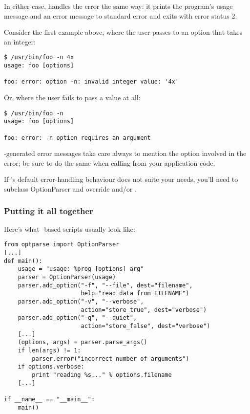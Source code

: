 In either case,  handles the error the same way: it prints the
program's usage message and an error message to standard error and
exits with error status 2.

Consider the first example above, where the user passes  to an
option that takes an integer:
\begin{verbatim}
$ /usr/bin/foo -n 4x
usage: foo [options]

foo: error: option -n: invalid integer value: '4x'
\end{verbatim}

Or, where the user fails to pass a value at all:
\begin{verbatim}
$ /usr/bin/foo -n
usage: foo [options]

foo: error: -n option requires an argument
\end{verbatim}

-generated error messages take care always to mention the option
involved in the error; be sure to do the same when calling
 from your application code.

If 's default error-handling behaviour does not suite your needs,
you'll need to subclass OptionParser and override  and/or
.


\subsubsection{Putting it all together\label{optparse-putting-it-all-together}}

Here's what -based scripts usually look like:
\begin{verbatim}
from optparse import OptionParser
[...]
def main():
    usage = "usage: %prog [options] arg"
    parser = OptionParser(usage)
    parser.add_option("-f", "--file", dest="filename",
                      help="read data from FILENAME")
    parser.add_option("-v", "--verbose",
                      action="store_true", dest="verbose")
    parser.add_option("-q", "--quiet",
                      action="store_false", dest="verbose")
    [...]
    (options, args) = parser.parse_args()
    if len(args) != 1:
        parser.error("incorrect number of arguments")
    if options.verbose:
        print "reading %s..." % options.filename
    [...]

if __name__ == "__main__":
    main()
\end{verbatim}


